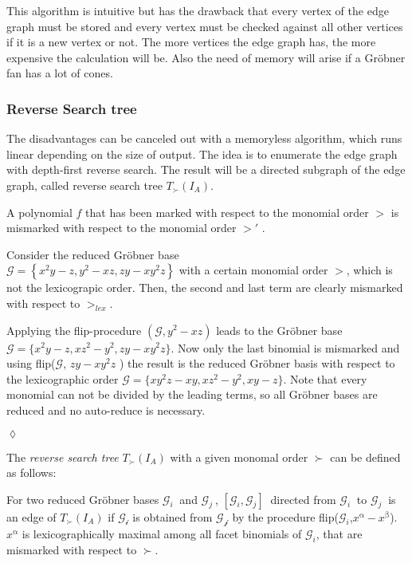 This algorithm is intuitive but has the drawback that every vertex of the edge graph must be stored and every vertex must be checked against all other vertices if it is a new vertex or not. 
The more vertices the edge graph has, the more expensive the calculation will be. Also the need of memory will arise if a Gröbner fan has a lot of cones.
 
 \newpage

\subsubsection{Reverse Search tree}
The disadvantages can be canceled out with a memoryless algorithm, which runs linear depending on the size of output. The idea is to enumerate the edge graph with depth-first reverse search. The result will be a directed subgraph of the edge graph, called reverse search tree $T_{\succ}(I_{A}) $.\\
\begin{env_definition}
\cite{tigers}
A polynomial $f$ that has been marked with respect to the monomial order $>$  is mismarked with respect to the monomial order $>'$  .
\end{env_definition}

\begin{env_example}\normalfont
Consider the reduced Gröbner base \\ $\mathcal{G} = \left\lbrace x^{2}y-z,y^{2}-xz, zy-xy^{2}z \right\rbrace $ 
with a certain monomial order $>$, which is not the lexicograpic order.
Then, the second and last term are clearly mismarked with respect to $>_{lex}$.

Applying the flip-procedure $(\mathcal{G},y^{2}-xz)$ leads to the Gröbner base $\mathcal{G} = \{x^{2}y-z,xz^{2}-y^{2}, zy-xy^{2}z \} $. Now only the last binomial is mismarked and using flip($\mathcal{G}$, $zy-xy^{2}z$ ) the result is the reduced Gröbner basis with respect to the lexicographic order $\mathcal{G} = \{xy^{2}z -xy, xz^{2}-y^{2},xy-z \} $. Note that every monomial can not be divided by the leading terms, so all Gröbner bases are reduced and no auto-reduce is necessary.
 
\begin{flushright}
$\lozenge$
\end{flushright} 
\end{env_example}


The \textit{reverse search tree} $T_{\succ}(I_{A}) $ with a given monomal order $ \succ $ can be defined as follows:
\begin{env_definition}
\label{def:reverse}
\cite{tigers} For two reduced Gröbner bases $ \mathcal{G}_{i}~$ and $ \mathcal{G}_{j}~$, $[\mathcal{G}_{i},\mathcal{G}_{j} ]~$ directed from $\mathcal{G}_{i}~$ to $\mathcal{G}_{j}~$ is an edge of $T_{\succ}(I_{A}) $ if $\mathcal{G_{i}}$ is obtained from $\mathcal{G_{j}}$ by the procedure flip($\mathcal{G}_{i}$,$x^{\upalpha} - x^{\upbeta}$).
$x^{\upalpha}$ is lexicographically maximal among all facet binomials of $\mathcal{G}_{i}$, that are mismarked with respect to $\succ$.
\end{env_definition}


